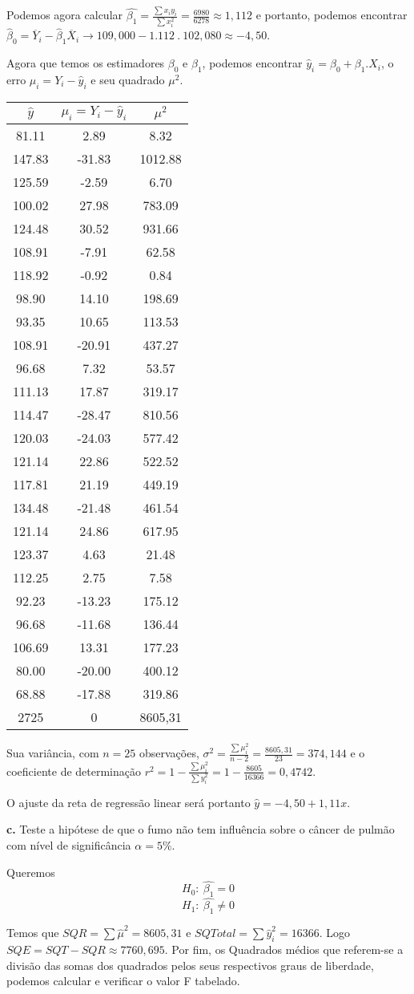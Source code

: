 \documentclass[
]{book}
\begin{document}
Podemos agora calcular \(\hat{\beta_1}=\frac{\sum x_i y_i}{\sum x_i^2}=\frac{6980}{6278}\approx 1,112\) e portanto, podemos encontrar \(\hat{\beta}_0=\overline{Y}_i-\hat{\beta}_1\overline{X}_i \rightarrow 109,000-1.112 \ . \ 102,080\approx -4,50\).

Agora que temos os estimadores \(\beta_0\) e \(\beta_1\), podemos encontrar \(\hat{y}_i=\beta_0+\beta_1 . X_i\), o erro \(\mu_i=Y_i-\hat{y}_i\) e seu quadrado \(\mu^2\).

\begin{longtable}[]{@{}ccc@{}}
\toprule
\(\hat{y}\) & \(\mu_i=Y_i-\hat{y}_i\) & \(\mu^2\)\tabularnewline
\midrule
\endhead
81.11 & 2.89 & 8.32\tabularnewline
147.83 & -31.83 & 1012.88\tabularnewline
125.59 & -2.59 & 6.70\tabularnewline
100.02 & 27.98 & 783.09\tabularnewline
124.48 & 30.52 & 931.66\tabularnewline
108.91 & -7.91 & 62.58\tabularnewline
118.92 & -0.92 & 0.84\tabularnewline
98.90 & 14.10 & 198.69\tabularnewline
93.35 & 10.65 & 113.53\tabularnewline
108.91 & -20.91 & 437.27\tabularnewline
96.68 & 7.32 & 53.57\tabularnewline
111.13 & 17.87 & 319.17\tabularnewline
114.47 & -28.47 & 810.56\tabularnewline
120.03 & -24.03 & 577.42\tabularnewline
121.14 & 22.86 & 522.52\tabularnewline
117.81 & 21.19 & 449.19\tabularnewline
134.48 & -21.48 & 461.54\tabularnewline
121.14 & 24.86 & 617.95\tabularnewline
123.37 & 4.63 & 21.48\tabularnewline
112.25 & 2.75 & 7.58\tabularnewline
92.23 & -13.23 & 175.12\tabularnewline
96.68 & -11.68 & 136.44\tabularnewline
106.69 & 13.31 & 177.23\tabularnewline
80.00 & -20.00 & 400.12\tabularnewline
68.88 & -17.88 & 319.86\tabularnewline
2725 & 0 & 8605,31\tabularnewline
\bottomrule
\end{longtable}

Sua variância, com \(n=25\) observações, \(\sigma^2=\frac{\sum \mu_i^2}{n-2}=\frac{8605,31}{23}=374,144\) e o coeficiente de determinação \(r^2=1-\frac{\sum \mu^2_i}{\sum y^2_i}=1-\frac{8605}{16366}=0,4742\).

O ajuste da reta de regressão linear será portanto \(\hat{y}=-4,50+1,11x\).

\textbf{c.} Teste a hipótese de que o fumo não tem influência sobre o câncer de pulmão com nível de significância \(\alpha=5\%\).

Queremos
\[H_0: \ \hat{\beta_1}=0\]
\[H_1: \ \hat{\beta_1}\neq 0\]

Temos que \(SQR = \sum \hat{\mu}^2 = 8605,31\) e \(SQ Total = \sum \hat{y}^2_i=16366\). Logo \(SQE = SQT - SQR \approx 7760,695.\) Por fim, os Quadrados médios que referem-se a divisão das somas dos quadrados pelos seus respectivos graus de liberdade, podemos calcular e verificar o valor F tabelado.
\end{document}

